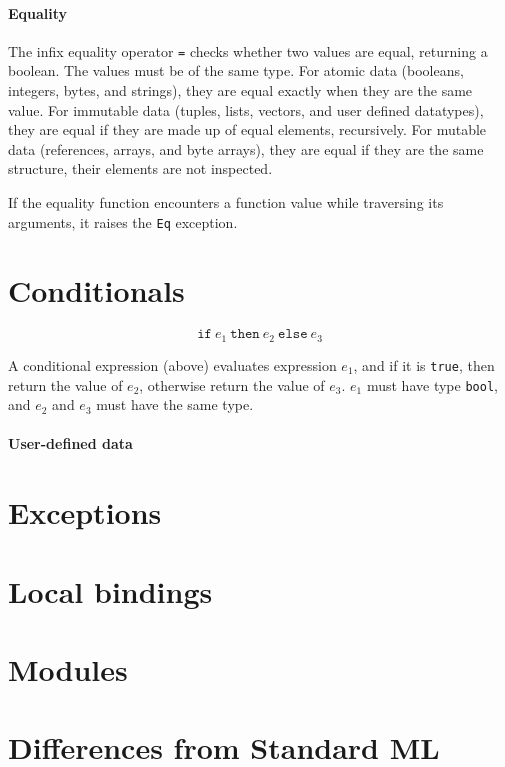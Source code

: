 \documentclass[12pt,a4paper]{book}
\begin{document}
\paragraph{Equality}

The infix equality operator \texttt{=} checks whether two values are equal, returning a boolean. The values must be of the same type. For atomic data (booleans, integers, bytes, and strings), they are equal exactly when they are the same value. For immutable data (tuples, lists, vectors, and user defined datatypes), they are equal if they are made up of equal elements, recursively. For mutable data (references, arrays, and byte arrays), they are equal if they are the same structure, their elements are not inspected.

If the equality function encounters a function value while traversing its arguments, it raises the \texttt{Eq} exception.

\section{Conditionals}
%
\[\texttt{if}\ e_1\ \texttt{then}\ e_2\ \texttt{else}\ e_3\]

A conditional expression (above) evaluates expression $e_1$, and if it is \texttt{true}, then return the value of $e_2$, otherwise return the value of $e_3$. $e_1$ must have type \texttt{bool}, and $e_2$ and $e_3$ must have the same type.


\paragraph{User-defined data}

\section{Exceptions}

\section{Local bindings}

\section{Modules}

\section{Differences from Standard ML}
\end{document}
